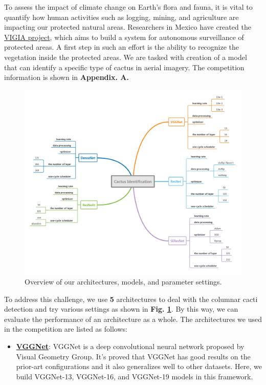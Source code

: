 \documentclass[a4paper]{article}
\begin{document}
\large{\noindent To assess the impact of climate change on Earth's flora and fauna, it is vital to quantify how human activities such as logging, mining, and agriculture are impacting our protected natural areas. Researchers in Mexico have created the \href{https://jivg.org/research-projects/vigia/}{VIGIA project}, which aims to build a system for autonomous surveillance of protected areas. A first step in such an effort is the ability to recognize the vegetation inside the protected areas. We are tasked with creation of a model that can identify a specific type of cactus in aerial imagery. The competition information is shown in \textbf{Appendix. A.}

\begin{figure}[h]
\centering
\includegraphics[width=15cm]{overview.pdf}
\caption{Overview of our architectures, models, and parameter settings.}
\label{overview}
\end{figure}

To address this challenge, we use \textbf{5} architectures to deal with the columnar cacti detection and try various settings as shown in \textbf{Fig. \ref{overview}}. By this way, we can evaluate the performance of an architecture as a whole. The architectures we used in the competition are listed as follows:

\begin{itemize}
    \item \href{https://arxiv.org/pdf/1409.1556.pdf}{\textbf{VGGNet}}: \textsf{VGGNet} is a deep convolutional neural network proposed by Visual Geometry Group. It's proved that \textsf{VGGNet} has good results on the prior-art configurations and it also generalizes well to other datasets. Here, we build \textsf{VGGNet-13}, \textsf{VGGNet-16}, and \textsf{VGGNet-19} models in this framework.
    

\end{itemize}}
\end{document}
